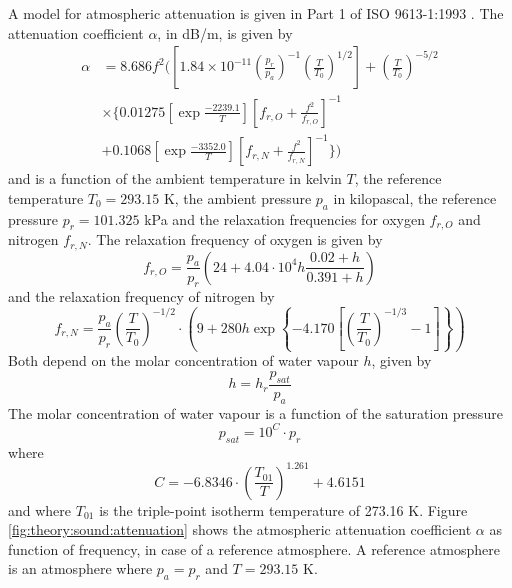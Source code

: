 A model for atmospheric attenuation is given in Part 1 of ISO 9613-1:1993 \cite{ISO9613-1}.
The attenuation coefficient $\alpha$, in dB/m, is given by
\begin{align}\label{eq:theory:sound:atmospheric-attenuation}
 \alpha &= 8.686 f^2 \Biggl( \left[ 1.84 \times 10^{-11} \left(\frac{p_r}{p_a}\right)^{-1} \left(\frac{T}{T_0}\right)^{1/2} \right] + \left(\frac{T}{T_0}\right)^{-5/2} \nonumber \\
 &\times \Biggl\{ 0.01275 \left[ \exp{\frac{-2239.1}{T}} \right]  \left[f_{r,O} + \frac{f^2}{f_{r,O}} \right]^{-1} \nonumber \\
 &+ 0.1068 \left[ \exp{\frac{-3352.0}{T}} \right] \left[ f_{r,N} + \frac{f^2}{f_{r,N}} \right]^{-1} \Biggr\} \Biggr)
\end{align}
and is a function of the ambient temperature in kelvin $T$, the reference
temperature $T_0=293.15$ K, the ambient pressure $p_a$ in kilopascal, the
reference pressure $p_r=101.325$ kPa and the relaxation frequencies for oxygen
$f_{r,O}$ and nitrogen $f_{r,N}$.
The relaxation frequency of oxygen is given by
\begin{equation}
 f_{r,O} = \frac{p_a}{p_r} \left( 24 + 4.04 \cdot 10^4 h \frac{0.02 + h}{0.391 + h}  \right)
\end{equation}
and the relaxation frequency of nitrogen by
\begin{equation}
 f_{r,N} = \frac{p_a}{p_r} \left( \frac{T}{T_0} \right)^{-1/2} \cdot \left( 9 + 280 h \exp{\left\{ -4.170 \left[ \left(\frac{T}{T_0} \right)^{-1/3} -1 \right] \right\} } \right)
\end{equation}
Both depend on the molar concentration of water vapour $h$, given by
\begin{equation}
 h = h_r  \frac{p_{sat}}{p_a}
\end{equation}
The molar concentration of water vapour is a function of the saturation pressure
\begin{equation}
 p_{sat} = 10^C \cdot p_r
\end{equation}
where
\begin{equation}
 C = -6.8346 \cdot \left( \frac{T_{01}}{T} \right)^{1.261}  + 4.6151
\end{equation}
and where $T_{01}$ is the triple-point isotherm temperature of 273.16 K.
Figure \ref{fig:theory:sound:attenuation} shows the atmospheric attenuation
coefficient $\alpha$ as function of frequency, in case of a reference
atmosphere. A reference atmosphere is an atmosphere where $p_a=p_r$ and
$T=293.15$ K.


